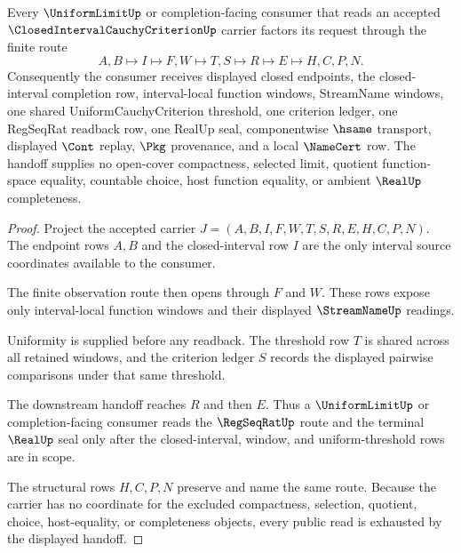 \begin{theorem}
\label{thm:closed-interval-cauchy-criterion-uniform-window-handoff}
Every $\UniformLimitUp$ or completion-facing consumer that reads an accepted $\ClosedIntervalCauchyCriterionUp$ carrier factors its request through the finite route
$$
A,B \longmapsto I \longmapsto F,W \longmapsto T,S \longmapsto R \longmapsto E \longmapsto H,C,P,N .
$$
Consequently the consumer receives displayed closed endpoints, the closed-interval completion row, interval-local function windows, StreamName windows, one shared UniformCauchyCriterion threshold, one criterion ledger, one RegSeqRat readback row, one RealUp seal, componentwise $\hsame$ transport, displayed $\Cont$ replay, $\Pkg$ provenance, and a local $\NameCert$ row. The handoff supplies no open-cover compactness, selected limit, quotient function-space equality, countable choice, host function equality, or ambient $\RealUp$ completeness.
\end{theorem}
\begin{proof}
Project the accepted carrier $J=(A,B,I,F,W,T,S,R,E,H,C,P,N)$. The endpoint rows $A,B$ and the closed-interval row $I$ are the only interval source coordinates available to the consumer.

The finite observation route then opens through $F$ and $W$. These rows expose only interval-local function windows and their displayed $\StreamNameUp$ readings.

Uniformity is supplied before any readback. The threshold row $T$ is shared across all retained windows, and the criterion ledger $S$ records the displayed pairwise comparisons under that same threshold.

The downstream handoff reaches $R$ and then $E$. Thus a $\UniformLimitUp$ or completion-facing consumer reads the $\RegSeqRatUp$ route and the terminal $\RealUp$ seal only after the closed-interval, window, and uniform-threshold rows are in scope.

The structural rows $H,C,P,N$ preserve and name the same route. Because the carrier has no coordinate for the excluded compactness, selection, quotient, choice, host-equality, or completeness objects, every public read is exhausted by the displayed handoff.
\end{proof}


